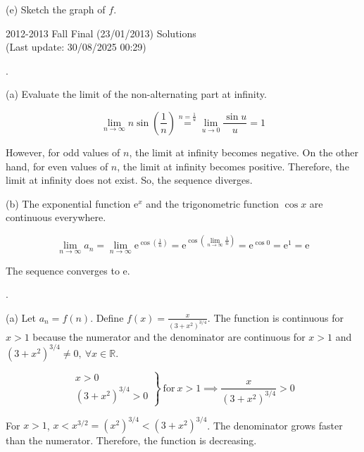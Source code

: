 \documentclass{article}
\begin{document}
\hfill

(e) Sketch the graph of $f$.

\newpage

\begin{center}
2012-2013 Fall Final (23/01/2013) Solutions\\
(Last update: 30/08/2025 00:29)
\end{center}

.

\hfill

\noindent (a) Evaluate the limit of the non-alternating part at infinity.

\[\lim_{n\to\infty}n\sin\left(\frac1n\right)\overset{n=\frac1u}{=}\lim_{u\to0}\frac{\sin u}u=1\]

\hfill

\noindent However, for odd values of $n$, the limit at infinity becomes negative. On the other hand, for even values of $n$, the limit at infinity becomes positive. Therefore, the limit at infinity does not exist. So, the sequence diverges.

\hfill

\noindent (b) The exponential function $\mathrm{e}^x$ and the trigonometric function $\cos x$ are continuous everywhere.

\[\lim_{n\to\infty}a_n=\lim_{n\to\infty}\mathrm{e}^{\displaystyle\cos\left(\frac1n\right)}=\mathrm{e}^{\displaystyle\cos\left(\lim_{n\to\infty}\frac1n\right)}=\mathrm{e}^{\cos0}=\mathrm{e}^1=\mathrm{e}\]

\hfill

\noindent The sequence converges to $\boxed{\mathrm{e}}$.

\hfill

.

\hfill

\noindent (a) Let $a_n=f(n)$. Define $\displaystyle f(x)=\frac x{\left(3+x^2\right)^{3/4}}$. The function is continuous for $x>1$ because the numerator and the denominator are continuous for $x>1$ and $\left(3+x^2\right)^{3/4}\neq0,\:\forall x\in\mathbb{R}$.

\[\left.\begin{array}{c}
x>0\\
\left(3+x^2\right)^{3/4}>0
\end{array}\right\}\:\text{for}\:x>1\implies\frac x{\left(3+x^2\right)^{3/4}}>0\]

\hfill

\noindent For $x>1$, $x<x^{3/2}=\left(x^2\right)^{3/4}<\left(3+x^2\right)^{3/4}$. The denominator grows faster than the numerator. Therefore, the function is decreasing.
\end{document}
